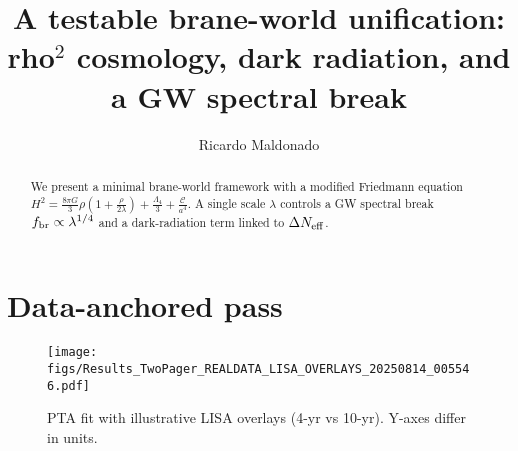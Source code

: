 \documentclass[reprint,aps,prd,showpacs,nofootinbib]{revtex4-2}
\begin{document}
\title{A testable brane-world unification: rho$^2$ cosmology, dark radiation, and a GW spectral break}
\author{Ricardo Maldonado}
\begin{abstract}
We present a minimal brane-world framework with a modified Friedmann equation
$H^2=\frac{8\pi G}3\rho\left(1+\frac{\rho}{2\lambda}\right)+\frac{\Lambda_4}3+\frac{\mathcal C}{a^4}$.
A single scale $\lambda$ controls a GW spectral break $f_{\rm br}\propto \lambda^{1/4}$ and a dark-radiation term linked to $\Delta N_{\rm eff}$.
\end{abstract}
\maketitle
\section{Data-anchored pass}
\begin{figure}[t]
\texttt{[image: figs/Results\_TwoPager\_REALDATA\_LISA\_OVERLAYS\_20250814\_005546.pdf]}
\caption{PTA fit with illustrative LISA overlays (4-yr vs 10-yr). Y-axes differ in units.}
\end{figure}
\end{document}
